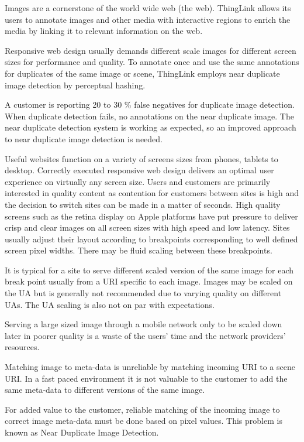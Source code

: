 \documentclass[english,12pt,a4paper,pdftex,elec,utf8]{aaltothesis}
\begin{document}
\thispagestyle{empty}

Images are a cornerstone of the world wide web (the web). ThingLink allows its users to annotate images and other media with interactive regions to enrich the media by linking it to relevant information on the web.

Responsive web design usually demands different scale images for different screen sizes for performance and quality. To annotate once and use the same annotations for duplicates of the same image or scene, ThingLink employs near duplicate image detection by perceptual hashing.

A customer is reporting 20 to 30 \% false negatives for duplicate image detection. When duplicate detection fails,  no annotations on the near duplicate image. The near duplicate detection system is working as expected, so an improved approach to near duplicate image detection is needed.

Useful websites function on a variety of screens sizes from phones, tablets to desktop. Correctly executed responsive web design delivers an optimal user experience on virtually any screen size. Users and customers are primarily interested in quality content as contention for customers between sites is high and the decision to switch sites can be made in a matter of seconds. High quality screens such as the retina display on Apple platforms have put pressure to deliver crisp and clear images on all screen sizes with high speed and low latency. Sites usually adjust their layout according to breakpoints corresponding to well defined screen pixel widths. There may be fluid scaling between these breakpoints.

It is typical for a site to serve different scaled version of the same image for each break point usually from a URI specific to each image. Images may be scaled on the UA but is generally not recommended due to varying quality on different UAs. The UA scaling is also not on par with expectations.

Serving a large sized image through a mobile network only to be scaled down later in poorer quality is a waste of the users' time and the network providers' resources.

Matching image to meta-data is unreliable by matching incoming URI to a scene URI. In a fast paced environment it is not valuable to the customer to add the same meta-data to different versions of the same image.

For added value to the customer, reliable matching of the incoming image to correct image meta-data must be done based on pixel values. This problem is known as Near Duplicate Image Detection.
\end{document}
